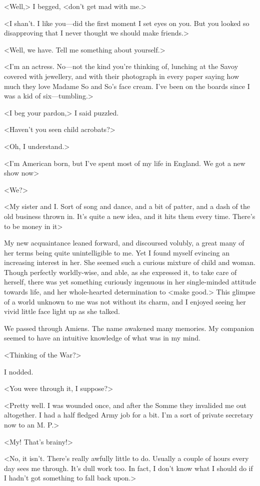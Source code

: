  <Well,> I begged, <don't get mad with me.> 

 <I shan't. I like you—did the first moment I set eyes on you. But you looked so disapproving that I never thought we should make friends.> 

 <Well, we have. Tell me something about yourself.> 

 <I'm an actress. No—not the kind you're thinking of, lunching at the Savoy covered with jewellery, and with their photograph in every paper saying how much they love Madame So and So's face cream. I've been on the boards since I was a kid of six—tumbling.> 

 <I beg your pardon,> I said puzzled. 

 <Haven't you seen child acrobats?> 

 <Oh, I understand.> 

 <I'm American born, but I've spent most of my life in England. We got a new show now\longdash> 

 <We?> 

 <My sister and I. Sort of song and dance, and a bit of patter, and a dash of the old business thrown in. It's quite a new idea, and it hits them every time. There's to be money in it\longdash> 

 My new acquaintance leaned forward, and discoursed volubly, a great many of her terms being quite unintelligible to me. Yet I found myself evincing an increasing interest in her. She seemed such a curious mixture of child and woman. Though perfectly worldly-wise, and able, as she expressed it, to take care of herself, there was yet something curiously ingenuous in her single-minded attitude towards life, and her whole-hearted determination to <make good.> This glimpse of a world unknown to me was not without its charm, and I enjoyed seeing her vivid little face light up as she talked. 

 We passed through Amiens. The name awakened many memories. My companion seemed to have an intuitive knowledge of what was in my mind. 

 <Thinking of the War?> 

 I nodded. 

 <You were through it, I suppose?> 

 <Pretty well. I was wounded once, and after the Somme they invalided me out altogether. I had a half fledged Army job for a bit. I'm a sort of private secretary now to an M. P.> 

 <My! That's brainy!> 

 <No, it isn't. There's really awfully little to do. Usually a couple of hours every day sees me through. It's dull work too. In fact, I don't know what I should do if I hadn't got something to fall back upon.> 

